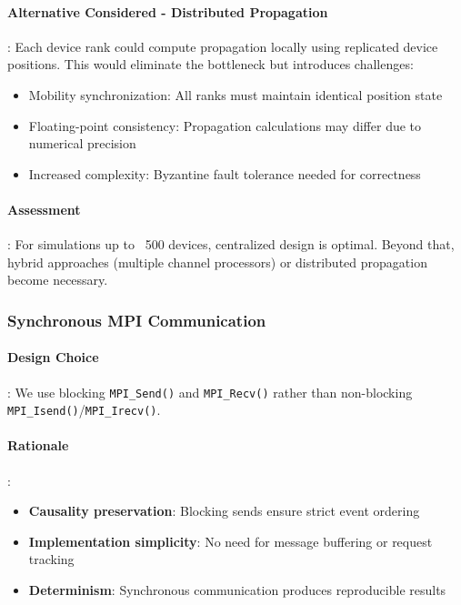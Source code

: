 \paragraph{Alternative Considered - Distributed Propagation}:
Each device rank could compute propagation locally using replicated device positions. This would eliminate the bottleneck but introduces challenges:
\begin{itemize}
    \item Mobility synchronization: All ranks must maintain identical position state
    \item Floating-point consistency: Propagation calculations may differ due to numerical precision
    \item Increased complexity: Byzantine fault tolerance needed for correctness
\end{itemize}

\paragraph{Assessment}:
For simulations up to ~500 devices, centralized design is optimal. Beyond that, hybrid approaches (multiple channel processors) or distributed propagation become necessary.

\subsubsection{Synchronous MPI Communication}

\paragraph{Design Choice}:
We use blocking \texttt{MPI\_Send()} and \texttt{MPI\_Recv()} rather than non-blocking \texttt{MPI\_Isend()}/\texttt{MPI\_Irecv()}.

\paragraph{Rationale}:
\begin{itemize}
    \item \textbf{Causality preservation}: Blocking sends ensure strict event ordering
    \item \textbf{Implementation simplicity}: No need for message buffering or request tracking
    \item \textbf{Determinism}: Synchronous communication produces reproducible results
\end{itemize}

